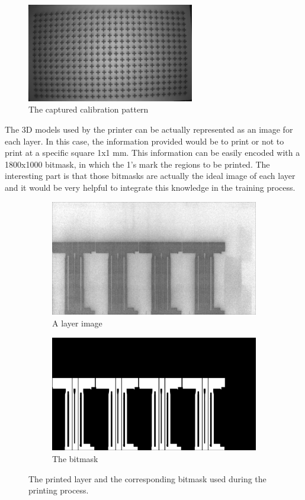 \begin{figure}[!h]
  \includegraphics[width=0.65\textwidth]{images/introduction/calibration_pattern}
  \centering
  \caption{The captured calibration pattern}
  \label{intro:calibration}
\end{figure}

The 3D models used by the printer can be actually represented as an image for each layer. In this case, the information provided would be to print or not to print at a specific square 1x1 mm. This information can be easily encoded with a 1800x1000 bitmask, in which the 1's mark the regions to be printed. The interesting part is that those bitmasks are actually the ideal image of each layer and it would be very helpful to integrate this knowledge in the training process. \\

\begin{figure}[!h]
\centering
\begin{subfigure}{.5\textwidth}
  \centering
  \includegraphics[width=.5\linewidth]{images/introduction/layer_00100}
  \caption{A layer image}
\end{subfigure}%
\begin{subfigure}{.5\textwidth}
  \centering
  \includegraphics[width=.5\linewidth]{images/introduction/bitmask_00100}
  \caption{The bitmask}
\end{subfigure}
\caption{The printed layer and the corresponding bitmask used during the printing process.}
\label{intr:layer_example}
\end{figure}

